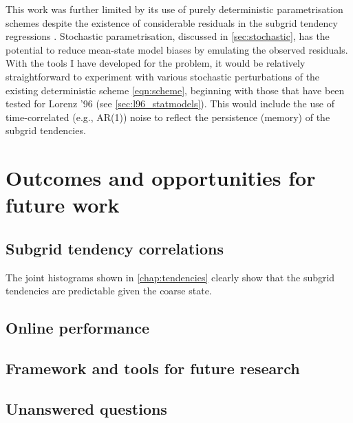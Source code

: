 \documentclass[../main.tex]{subfiles}
\begin{document}
This work was further limited by its use of purely deterministic
parametrisation schemes despite the existence of considerable residuals
in the subgrid tendency regressions
. Stochastic parametrisation, discussed in
\cref{sec:stochastic}, has the potential to reduce mean-state model
biases by emulating the observed residuals. With the tools I have developed for
the \rb{} problem, it would be relatively straightforward to experiment with
various stochastic perturbations of the existing deterministic scheme
\cref{eqn:scheme}, beginning with those that have been tested for
Lorenz '96 (see \cref{sec:l96_statmodels}). This would include the use
of time-correlated (e.g., AR(1)) noise to reflect the persistence (memory)
of the subgrid tendencies.


\section{Outcomes and opportunities for future work} \label{sec:outcomes}
\subsection{Subgrid tendency correlations}
The joint histograms shown in \cref{chap:tendencies} clearly show that the
subgrid tendencies are predictable given the coarse state.


\subsection{Online performance}


\subsection{Framework and tools for future research}


\subsection{Unanswered questions}
\end{document}
